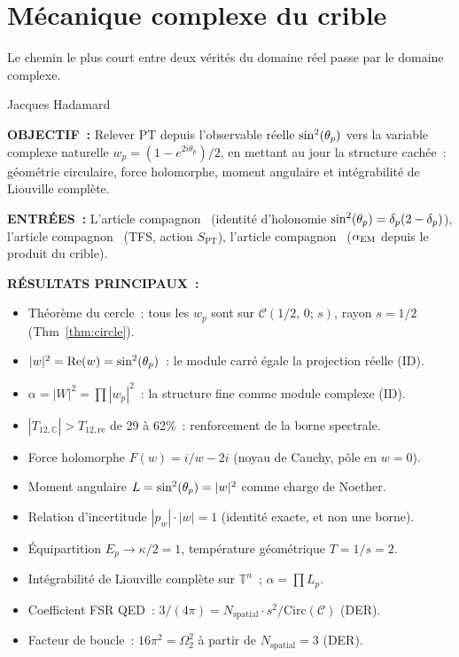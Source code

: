 \documentclass[12pt,a4paper]{article}
\begin{document}
\section{Mécanique complexe du crible}
\label{sec:complex}

\epigraph{Le chemin le plus court entre deux vérités du domaine réel
passe par le domaine complexe.}{Jacques Hadamard}

\begin{statusbox}
\textbf{OBJECTIF~:}
  Relever PT depuis l'observable réelle $\sin^2(\theta_{p})$ vers la variable
  complexe naturelle $w_p = (1 - e^{2i\theta_p})/2$, en mettant au
  jour la structure cachée~: géométrie circulaire, force holomorphe,
  moment angulaire et intégrabilité de Liouville complète.

\textbf{ENTRÉES~:}
  L'article compagnon~\cite{companion_M2} (identité d'holonomie
  $\sin^2(\theta_{p}) = \delta_p(2-\delta_p)$), l'article
  compagnon~\cite{companion_M1} (TFS, action $S_{\mathrm{PT}}$),
  l'article compagnon~\cite{companion_physics} ($\alpha_{\mathrm{EM}}$ depuis le
  produit du crible).

\textbf{RÉSULTATS PRINCIPAUX~:}
  \begin{itemize}[nosep]
  \item Théorème du cercle~: tous les $w_p$ sont sur
    $\mathcal{C}(1/2,\,0;\, s)$, rayon $s = 1/2$
    (Thm~\ref{thm:circle}).
  \item $|w|^2 = \mathrm{Re}(w) = \sin^2(\theta_{p})$~: le module carré égale la
    projection réelle (ID).
  \item $\alpha = |W|^2 = \prod |w_p|^2$~: la structure fine comme
    module complexe (ID).
  \item $|T_{12,\mathbb{C}}| > T_{12,\mathrm{re}}$ de 29 à 62\%~:
    renforcement de la borne spectrale.
  \item Force holomorphe $F(w) = i/w - 2i$ (noyau de Cauchy, pôle en
    $w = 0$).
  \item Moment angulaire $L = \sin^2(\theta_{p}) = |w|^2$ comme charge de
    Noether.
  \item Relation d'incertitude $|p_w|\cdot|w| = 1$ (identité exacte,
    et non une borne).
  \item Équipartition $E_p \to \kappa/2 = 1$, température géométrique
    $T = 1/s = 2$.
  \item Intégrabilité de Liouville complète sur $\mathbb{T}^n$~;
    $\alpha = \prod L_p$.
  \item Coefficient FSR QED~: $3/(4\pi) = N_{\mathrm{spatial}}\cdot
    s^2/\mathrm{Circ}(\mathcal{C})$ (DER).
  \item Facteur de boucle~: $16\pi^2 = \Omega_2^2$ à partir de
    $N_{\mathrm{spatial}} = 3$ (DER).
  \end{itemize}


\end{statusbox}
\end{document}
